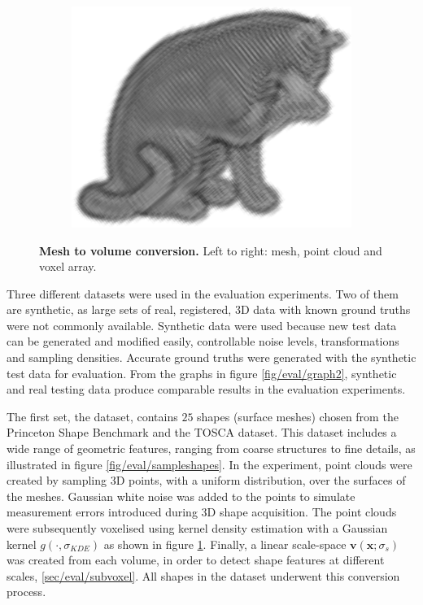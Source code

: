 \begin{figure}[ht]
	\begin{subfigure}[t]{0.31\linewidth} \centering 
		\includegraphics[height=0.85\linewidth]{./fig/eval/cat_volume.png}
	\end{subfigure}
	\caption{\textbf{Mesh to volume conversion.} Left to right: mesh, point cloud and voxel array.} 
	\label{fig/eval/vol_conversion}
\end{figure}

Three different datasets were used in the evaluation experiments. Two of them are synthetic, as large sets of real, registered, 3D data with known ground truths were not commonly available. Synthetic data were used because new test data can be generated and modified easily, \eg controllable noise levels, transformations and sampling densities. Accurate ground truths were generated with the synthetic test data for evaluation.  
From the graphs in figure \ref{fig/eval/graph2}, synthetic and real testing data produce comparable results in the evaluation experiments. 

The first set, the \meshset dataset, contains $25$ shapes (surface meshes) chosen from the Princeton Shape Benchmark \cite{Shilane2004} and the TOSCA \cite{Bronstein2008} dataset. 
This dataset includes a wide range of geometric features, ranging from coarse structures to fine details, as illustrated in figure \ref{fig/eval/sampleshapes}. In the experiment, point clouds were created by sampling 3D points, with a uniform distribution, over the surfaces of the meshes. Gaussian white noise was added to the points to simulate measurement errors introduced during 3D shape acquisition. 
The point clouds were subsequently voxelised using kernel density estimation with a Gaussian kernel $g(\cdot,\sigma_{KDE})$ as shown in figure \ref{fig/eval/vol_conversion}.
Finally, a linear scale-space $\mathbf{v}(\mathbf{x};\sigma_s)$ was created from each volume, in order to detect shape features at different scales, \cf \ref{sec/eval/subvoxel}. All shapes in the dataset underwent this conversion process. 

